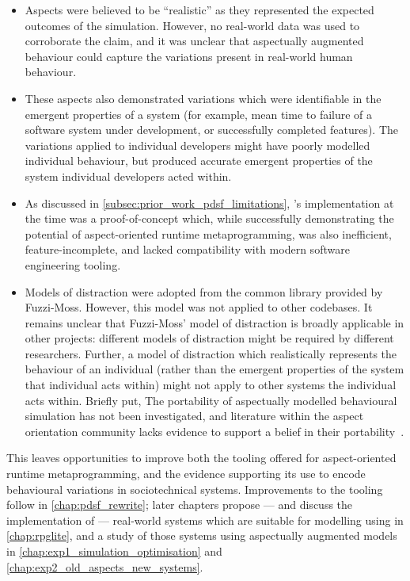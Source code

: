 \begin{itemize}
    \item Aspects were believed to be ``realistic'' as they represented the
    expected outcomes of the simulation. However, no real-world data was used to
    corroborate the claim, and it was unclear that aspectually augmented
    behaviour could capture the variations present in real-world human
    behaviour.
    \item These aspects also demonstrated variations which were identifiable in
    the emergent properties of a system (for example, mean time to failure of a
    software system under development, or successfully completed features). The
    variations applied to individual developers might have poorly modelled
    individual behaviour, but produced accurate emergent properties of the
    system individual developers acted within.
    \item As discussed in \cref{subsec:prior_work_pdsf_limitations}, \pdsf's
    implementation at the time was a proof-of-concept which, while successfully
    demonstrating the potential of aspect-oriented runtime metaprogramming, was
    also inefficient, feature-incomplete, and lacked compatibility with modern
    software engineering tooling.
    \item Models of distraction were adopted from the common library provided by
    Fuzzi-Moss. However, this model was not applied to other codebases. It
    remains unclear that Fuzzi-Moss' model of distraction is broadly applicable
    in other projects: different models of distraction might be required by
    different researchers. Further, a model of distraction which realistically
    represents the behaviour of an individual (rather than the emergent
    properties of the system that individual acts within) might not apply to
    other systems the individual acts within. Briefly put, The portability of
    aspectually modelled behavioural simulation has not been investigated, and
    literature within the aspect orientation community lacks evidence to support
    a belief in their portability~\cite{przybylek2010wrong,Constantinides04aopconsidered,steimann06paradoxical}.
\end{itemize}

This leaves opportunities to improve both the tooling offered for aspect-oriented
runtime metaprogramming, and the evidence supporting its use to encode
behavioural variations in sociotechnical systems. Improvements to the tooling
follow in \cref{chap:pdsf_rewrite}; later chapters propose --- and discuss the
implementation of --- real-world systems which are suitable for modelling using
\pdsf{} in \cref{chap:rpglite}, and a study of those systems using aspectually
augmented models in \cref{chap:exp1_simulation_optimisation} and \cref{chap:exp2_old_aspects_new_systems}.
